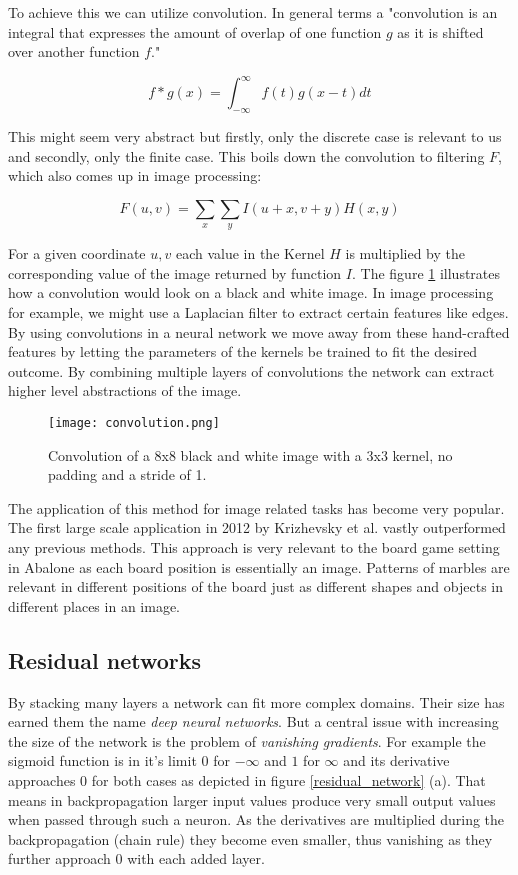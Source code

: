 To achieve this we can utilize convolution. In general terms a "convolution is an integral that expresses the amount of overlap of one function $g$ as it is shifted over another function $f$." \cite{weisstein_convolution_nodate}

$$
    f * g(x) = \int_{-\infty}^{\infty} f(t)g(x - t) dt
$$

This might seem very abstract but firstly, only the discrete case is relevant to us and secondly, only the finite case. This boils down the convolution to filtering $F$, which also comes up in image processing:

$$
    F(u, v) = \sum_{x} \sum_{y} I(u+x, v+y)H(x, y)
$$

For a given coordinate $u,v$ each value in the Kernel $H$ is multiplied by the  corresponding value of the image returned by function $I$. The figure \ref{convolution} illustrates how a convolution would look on a black and white image. In image processing for example, we might use a Laplacian filter to extract certain features like edges. By using convolutions in a neural network we move away from these hand-crafted features by letting the parameters of the kernels be trained to fit the desired outcome. By combining multiple layers of convolutions the network can extract higher level abstractions of the image. \cite{ilin_abstraction_2017}

\begin{figure}
    \centering
    \texttt{[image: convolution.png]}
    \caption{Convolution of a 8x8 black and white image with a 3x3 kernel, no padding and a stride of 1. \cite{bruasdal_deep_2020}}
    \label{convolution}
\end{figure}


The application of this method for image related tasks has become very popular. The first large scale application in 2012 by Krizhevsky et al. \cite{krizhevsky_imagenet_2017} vastly outperformed any previous methods. This approach is very relevant to the board game setting in Abalone as each board position is essentially an image. Patterns of marbles are relevant in different positions of the board just as different shapes and objects in different places in an image.

\subsection{Residual networks}
By stacking many layers a network can fit more complex domains. Their size has earned them the name \textit{deep neural networks}. But a central issue with increasing the size of the network is the problem of \textit{vanishing gradients}. For example the sigmoid function is in it's limit $0$ for $-\infty$ and $1$ for $\infty$ and its derivative approaches $0$ for both cases as depicted in figure \ref{residual_network} (a). That means in backpropagation larger input values produce very small output values when passed through such a neuron. As the derivatives are multiplied during the backpropagation (chain rule) they become even smaller, thus vanishing as they further approach $0$ with each added layer.

